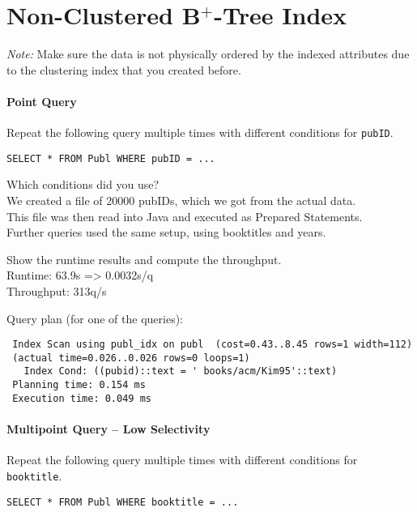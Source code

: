\documentclass[11pt]{scrartcl}
\begin{document}
\section{Non-Clustered B$^+$-Tree Index}

\noindent \emph{Note:} Make sure the data is not physically ordered by
the indexed attributes due to the clustering index that you created
before.

\paragraph{Point Query}

Repeat the following query multiple times with different conditions for {\tt pubID}.

{\small
\begin{verbatim}
SELECT * FROM Publ WHERE pubID = ...
\end{verbatim}
}

\noindent
Which conditions did you use?\\
We created a file of 20000 pubIDs, which we got from the actual data.\\
This file was then read into Java and executed as Prepared Statements.\\
Further queries used the same setup, using booktitles and years.

\smallskip\noindent
Show the runtime results and compute the throughput.\\
Runtime: 63.9s => 0.0032s/q\\
Throughput: 313q/s

\smallskip\noindent
Query plan (for one of the queries):
{\small
\begin{verbatim}
 Index Scan using publ_idx on publ  (cost=0.43..8.45 rows=1 width=112)
 (actual time=0.026..0.026 rows=0 loops=1)
   Index Cond: ((pubid)::text = ' books/acm/Kim95'::text)
 Planning time: 0.154 ms
 Execution time: 0.049 ms
\end{verbatim}
}


\paragraph{Multipoint Query -- Low Selectivity}

Repeat the following query multiple times with different conditions for {\tt booktitle}.

{\small
\begin{verbatim}
SELECT * FROM Publ WHERE booktitle = ...
\end{verbatim}
}
\end{document}
